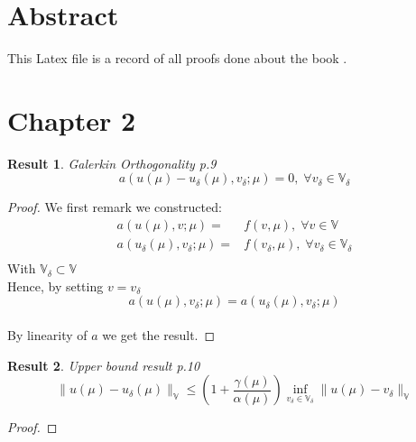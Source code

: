 \documentclass{article}
\newtheorem{result}{Result}
\begin{document}
\section*{Abstract}
This Latex file is a record of all proofs done about the book \cite{hesthaven2016certified}.

\section*{Chapter 2}

\begin{result}{Galerkin Orthogonality p.9}
$$ a\left( u(\mu )-u_{\delta }(\mu ),v_{\delta };\mu \right) = 0, \; \forall v_{\delta } \in \mathbb{V}_{\delta }$$
\end{result}
\begin{proof}
We first remark we constructed:
\begin{align*}
a\left ( u(\mu ),v;\mu \right ) =& f(v,\mu ), \; \forall v \in \mathbb{V}\\
a\left ( u_{\delta }(\mu ),v_{\delta };\mu \right ) =& f(v_{\delta },\mu ), \; \forall v_{\delta } \in \mathbb{V}_{\delta }\\
\end{align*}
With $\mathbb{V}_{\delta } \subset \mathbb{V}$\\
Hence, by setting $v=v_{\delta }$\\
$$a\left ( u(\mu ),v_{\delta };\mu \right ) = a\left ( u_{\delta }(\mu ),v_{\delta };\mu \right )$$\\
By linearity of $a$ we get the result.
\end{proof}

\begin{result}{Upper bound result p.10}
$$ \| u(\mu )-u_{\delta }(\mu )\| _{\mathbb{V} } \leq \left( 1+\frac{\gamma (\mu )}{\alpha (\mu )} \right) \inf _{v_{\delta } \in \mathbb{V}_{\delta }}\| u(\mu )-v_{\delta }\| _{\mathbb{V} }$$
\end{result}
\begin{proof}

\end{proof}



\end{document}
